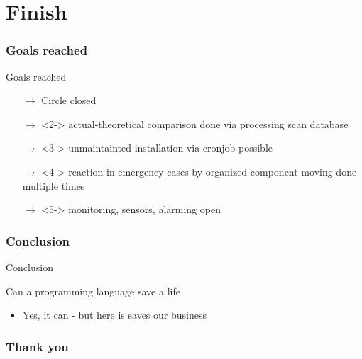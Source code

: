 \documentclass[ngerman,xcolor={table,dvipsnames},smaller,compress,hyperref={bookmarks,colorlinks}]{beamer}%
\begin{document}

\part{Finish}

\section{Goals reached}

\begin{frame}[fragile]{}
\begin{block}{Goals reached}
\begin{itemize}
\item[$\rightarrow$] Circle closed
\item[$\rightarrow$]<2-> actual-theoretical comparison done via processing scan database
\item[$\rightarrow$]<3-> unmaintainted installation via cronjob possible
\item[$\rightarrow$]<4-> reaction in emergency cases by organized component moving done multiple times
\item[$\rightarrow$]<5-> monitoring, sensors, alarming open
\end{itemize}
\end{block}
\end{frame}

\section{Conclusion}

\begin{frame}[fragile]{Conclusion}
\begin{block}{Can a programming language save a life}
\begin{itemize}
\item Yes, it can - but here is saves our business
\end{itemize}
\end{block}
\end{frame}

\section{Thank you}
\end{document}
